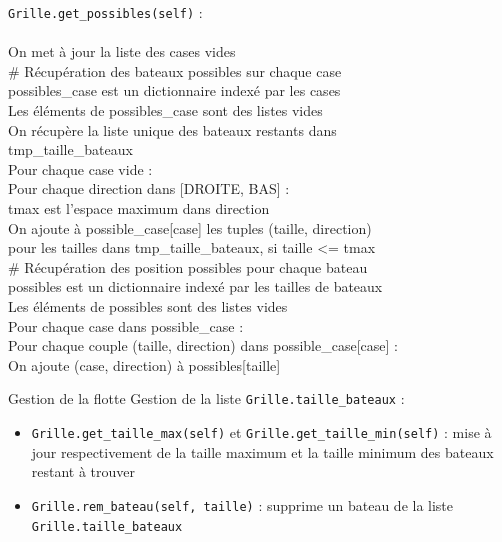 {
\begin{frame}[allowframebreaks]
\texttt{Grille.get\_possibles(self)} :\\~\\
On met à jour la liste des cases vides\\
\# Récupération des bateaux possibles sur chaque case\\
possibles\_case est un dictionnaire indexé par les cases\\
Les éléments de possibles\_case sont des listes vides\\
On récupère la liste unique des bateaux restants dans\\  tmp\_taille\_bateaux\\
Pour chaque case vide :\\
Pour chaque direction dans [DROITE, BAS] :\\
tmax est l'espace maximum dans direction\\
On ajoute à possible\_case[case] les tuples (taille, direction)\\
pour les tailles dans tmp\_taille\_bateaux, si taille <= tmax\\
\framebreak
\# Récupération des position possibles pour chaque bateau\\
possibles est un dictionnaire indexé par les tailles de bateaux\\
Les éléments de possibles sont des listes vides\\
Pour chaque case dans possible\_case :\\
Pour chaque couple (taille, direction) dans possible\_case[case] :\\
On ajoute (case, direction) à possibles[taille]\\ 
\end{frame}
}


\begin{frame}{Gestion de la flotte}
Gestion de la liste \texttt{Grille.taille\_bateaux} :
\begin{itemize}
\item \texttt{Grille.get\_taille\_max(self)} et \texttt{Grille.get\_taille\_min(self)} : mise à jour respectivement de la taille maximum et la taille minimum des bateaux restant à trouver
\item \texttt{Grille.rem\_bateau(self, taille)} : supprime un bateau de la liste \texttt{Grille.taille\_bateaux}
\end{itemize}
\end{frame}


